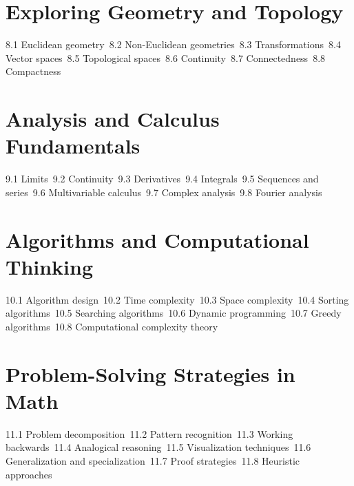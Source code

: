 \section{Exploring Geometry and Topology}
8.1 Euclidean geometry\
8.2 Non-Euclidean geometries\
8.3 Transformations\
8.4 Vector spaces\
8.5 Topological spaces\
8.6 Continuity\
8.7 Connectedness\
8.8 Compactness\
\section{Analysis and Calculus Fundamentals}
9.1 Limits\
9.2 Continuity\
9.3 Derivatives\
9.4 Integrals\
9.5 Sequences and series\
9.6 Multivariable calculus\
9.7 Complex analysis\
9.8 Fourier analysis\
\section{Algorithms and Computational Thinking}
10.1 Algorithm design\
10.2 Time complexity\
10.3 Space complexity\
10.4 Sorting algorithms\
10.5 Searching algorithms\
10.6 Dynamic programming\
10.7 Greedy algorithms\
10.8 Computational complexity theory\
\section{Problem-Solving Strategies in Math}
11.1 Problem decomposition\
11.2 Pattern recognition\
11.3 Working backwards\
11.4 Analogical reasoning\
11.5 Visualization techniques\
11.6 Generalization and specialization\
11.7 Proof strategies\
11.8 Heuristic approaches\

